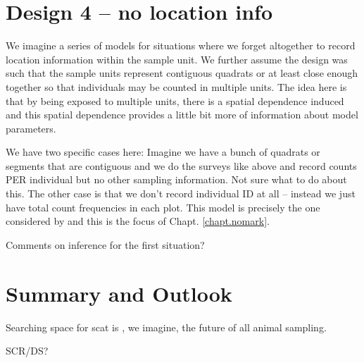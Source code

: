 \section{Design 4 -- no location info }

We imagine a series of models for situations where we forget
altogether to record location information within the sample unit. We
further assume the design was such that the sample units represent
contiguous quadrats or at least close enough together so that
individuals may be counted in multiple units. The idea here is that by
being exposed to multiple units, there is a spatial dependence induced
and this spatial dependence provides a little bit more of information
about model parameters. 

We have two specific cases here:
Imagine we have a bunch of quadrats or segments that are contiguous
and we do the surveys like above and record counts PER individual  but
no other sampling information.  Not sure what to do about this.
The other case is that we don't record individual ID at all -- instead
we just have total count frequencies in each plot. 
This model is precisely the one considered by
\citep{chandler_royle:2012} and this is the focus of Chapt. \ref{chapt.nomark}.

Comments on inference for the first situation?




\section{Summary and Outlook}


Searching space for scat is , we imagine, the future of all animal
sampling. 


SCR/DS?